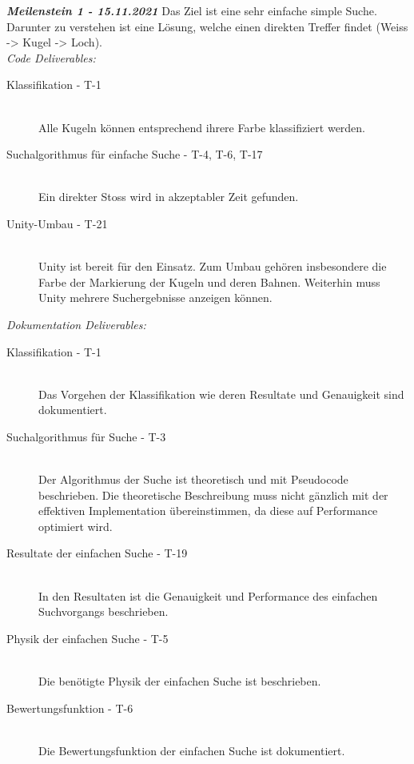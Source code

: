 \textit{\textbf{Meilenstein 1 - 15.11.2021}}
Das Ziel ist eine sehr einfache simple Suche. Darunter zu verstehen ist eine Lösung, welche einen direkten Treffer findet
(Weiss -> Kugel -> Loch).\\
\textit{Code Deliverables:}
\begin{description}
    \item[Klassifikation - T-1]\hfill \\
    Alle Kugeln können entsprechend ihrere Farbe klassifiziert werden.
    \item[Suchalgorithmus für einfache Suche - T-4, T-6, T-17]\hfill \\
    Ein direkter Stoss wird in akzeptabler Zeit gefunden.
    \item[Unity-Umbau - T-21]\hfill \\
    Unity ist bereit für den Einsatz. Zum Umbau gehören insbesondere die Farbe der Markierung der Kugeln und deren
    Bahnen. Weiterhin muss Unity mehrere Suchergebnisse anzeigen können.
\end{description}
\textit{Dokumentation Deliverables:}
\begin{description}
    \item[Klassifikation - T-1]\hfill \\
    Das Vorgehen der Klassifikation wie deren Resultate und Genauigkeit sind dokumentiert.
    \item[Suchalgorithmus für Suche - T-3]\hfill \\
    Der Algorithmus der Suche ist theoretisch und mit Pseudocode beschrieben.
    Die theoretische Beschreibung muss nicht gänzlich mit der effektiven Implementation übereinstimmen, da diese auf
    Performance optimiert wird.
    \item[Resultate der einfachen Suche - T-19]\hfill \\
    In den Resultaten ist die Genauigkeit und Performance des einfachen Suchvorgangs
    beschrieben.
    \item[Physik der einfachen Suche - T-5]\hfill \\
    Die benötigte Physik der einfachen Suche ist beschrieben.
    \item[Bewertungsfunktion - T-6]\hfill \\
    Die Bewertungsfunktion der einfachen Suche ist dokumentiert.
\end{description}

~\\

